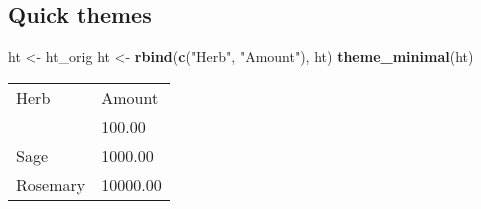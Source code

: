 \documentclass[]{article}
\newenvironment{Shaded}{\begin{snugshade}}{\end{snugshade}}
\newcommand{\KeywordTok}[1]{\textcolor[rgb]{0.13,0.29,0.53}{\textbf{{#1}}}}
\newcommand{\StringTok}[1]{\textcolor[rgb]{0.31,0.60,0.02}{{#1}}}
\newcommand{\NormalTok}[1]{{#1}}
\begin{document}
\FloatBarrier

\subsection{Quick themes}\label{quick-themes}

\begin{Shaded}
\begin{Highlighting}[]
\NormalTok{ht <-}\StringTok{ }\NormalTok{ht_orig}
\NormalTok{ht <-}\StringTok{ }\KeywordTok{rbind}\NormalTok{(}\KeywordTok{c}\NormalTok{(}\StringTok{"Herb"}\NormalTok{, }\StringTok{"Amount"}\NormalTok{), ht)}
\KeywordTok{theme_minimal}\NormalTok{(ht)}
\end{Highlighting}
\end{Shaded}

\begin{table}[h]
\begin{centering}\begin{tabularx}{0.25\textwidth}{p{} p{}}
\multicolumn{1}{p{0.125\textwidth}|}{\raggedright\rule{0pt}{\baselineskip+4pt}\hspace*{4pt}Herb\hspace*{4pt}\rule[-4pt]{0pt}{4pt}} & \multicolumn{1}{p{0.125\textwidth}}{\raggedright\rule{0pt}{\baselineskip+4pt}\hspace*{4pt}Amount\hspace*{4pt}\rule[-4pt]{0pt}{4pt}} \tabularnewline[-0.5pt]
\hhline{>{\arrayrulecolor{black}}->{\arrayrulecolor{black}}-}
\arrayrulecolor{black}
\multicolumn{1}{p{0.125\textwidth}|}{\raggedright\rule{0pt}{\baselineskip+4pt}\hspace*{4pt}Parsley\hspace*{4pt}\rule[-4pt]{0pt}{4pt}} & \multicolumn{1}{p{0.125\textwidth}}{\raggedright\rule{0pt}{\baselineskip+4pt}\hspace*{4pt}100.00\hspace*{4pt}\rule[-4pt]{0pt}{4pt}} \tabularnewline[-0.5pt]
\multicolumn{1}{p{0.125\textwidth}|}{\raggedright\rule{0pt}{\baselineskip+4pt}\hspace*{4pt}Sage\hspace*{4pt}\rule[-4pt]{0pt}{4pt}} & \multicolumn{1}{p{0.125\textwidth}}{\raggedright\rule{0pt}{\baselineskip+4pt}\hspace*{4pt}1000.00\hspace*{4pt}\rule[-4pt]{0pt}{4pt}} \tabularnewline[-0.5pt]
\multicolumn{1}{p{0.125\textwidth}|}{\raggedright\rule{0pt}{\baselineskip+4pt}\hspace*{4pt}Rosemary\hspace*{4pt}\rule[-4pt]{0pt}{4pt}} & \multicolumn{1}{p{0.125\textwidth}}{\raggedright\rule{0pt}{\baselineskip+4pt}\hspace*{4pt}10000.00\hspace*{4pt}\rule[-4pt]{0pt}{4pt}} \tabularnewline[-0.5pt]

\end{tabularx}
\end{centering}
\end{table}
\end{document}
